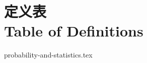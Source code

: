 \documentclass[class=report,crop=false]{standalone}
\begin{document}
\chapter{定义表 \\Table of Definitions}





{probability-and-statistics.tex}
\end{document}
